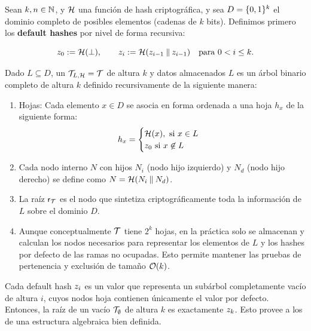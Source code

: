 \begin{definition}
\label{def:apendice-a-sparse-merkle-tree-default-hashes-sparse-merkle-tree}
	Sean $k, n \in \mathbb{N}$, y $\mathcal{H}$ una función de hash criptográfica, y sea $D = \{0,1\}^{k}$ el dominio completo de posibles elementos (cadenas de $k$ bits). Definimos primero los \textbf{default hashes} por nivel de forma recursiva:
	
	$$z_0 := \mathcal{H}(\bot), \qquad z_{i} := \mathcal{H}(z_{i-1} \mathbin{\|} z_{i-1}) \quad \text{para } 0 < i \leq k.$$
	
		Dado $L \subseteq D$, un \SMT $\mathcal{T}_{L,\mathcal{H}} = \mathcal{T}$ de altura $k$ y datos almacenados $L$ es un árbol binario completo de altura $k$ definido recursivamente de la siguiente manera:
	\begin{enumerate}
		\item Hojas: Cada elemento $x \in D$ se asocia en forma ordenada a una hoja $h_x$ de la siguiente forma:
		$$h_x = \begin{cases}
		\mathcal{H}(x), \text{ si } x \in L \\
		z_0 \text{ si } x \not\in L
		\end{cases}$$
		\item Cada nodo interno $N$ con hijos $N_i$ (nodo hijo izquierdo) y $N_d$ (nodo hijo derecho) se define como $N = \mathcal{H}(N_i \mathbin{\|} N_d)$.
		\item La raíz $\mathsf{r}_{\mathcal{T}}$ es el nodo que sintetiza criptográficamente toda la información de $L$ sobre el dominio $D$.
		\item Aunque conceptualmente $\mathcal{T}$ tiene $2^k$ hojas, en la práctica solo se almacenan y calculan los nodos necesarios para representar los elementos de $L$ y los hashes por defecto de las ramas no ocupadas. Esto permite mantener las pruebas de pertenencia y exclusión de tamaño $\mathcal{O}(k)$.
	\end{enumerate}
\end{definition}

Cada default hash $z_{i}$ es un valor que representa un subárbol completamente vacío de altura $i$, cuyos nodos hoja contienen únicamente el valor por defecto. Entonces, la raíz de un \SMT vacío $\mathcal{T}_\emptyset$ de altura $k$ es exactamente $z_{k}$. Esto provee a los \SMT de una estructura algebraica bien definida.

